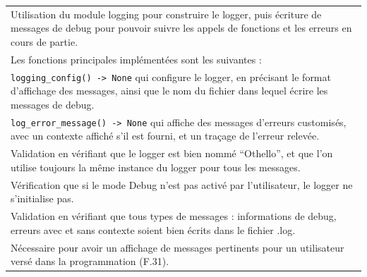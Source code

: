 \documentclass[a4paper,12pt]{article}
\begin{document}
\begin{tabularx}{\textwidth}{|X|}
    Utilisation du module logging pour construire le logger, puis écriture de
    messages de debug pour pouvoir suivre les appels de fonctions et les erreurs en
    cours de partie.                                                                                                                                                                                                                          \\ Les fonctions principales implémentées sont les suivantes :
    \\ \texttt{logging\_config() -> None} qui configure le logger, en précisant le
    format d’affichage des messages, ainsi que le nom du fichier dans lequel écrire
    les messages de debug.                                                                                                                                                                                                                    \\ \texttt{log\_error\_message() -> None} qui affiche
    des messages d’erreurs customisés, avec un contexte affiché s'il est fourni, et
    un traçage de l’erreur relevée.                                                                                                                                                                                                           \\ \arrayrulecolor{MediumAquamarine}\hline
    \arrayrulecolor{CornflowerBlue} Validation en vérifiant que le logger est bien
    nommé “Othello”, et que l’on utilise toujours la même instance du logger pour
    tous les messages.                                                                                                                                                                                                                        \\ Vérification que si le mode Debug n’est pas activé par
    l’utilisateur, le logger ne s’initialise pas.                                                                                                                                                                                             \\ Validation en vérifiant que
    tous types de messages : informations de debug, erreurs avec et sans contexte
    soient bien écrits dans le fichier .log.                                                                                                                                                                                                  \\
    \arrayrulecolor{MediumAquamarine}\hline \arrayrulecolor{CornflowerBlue}
    Nécessaire pour avoir un affichage de messages pertinents pour un utilisateur
    versé dans la programmation (F.31).                                                                                                                                                                                                       \\ \hline
\end{tabularx}
\end{document}
